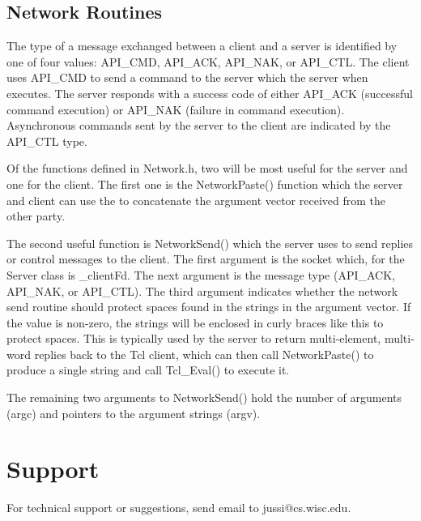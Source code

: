 \subsection{Network Routines\label{network}}

The type of a message exchanged between a client and a server is
identified by one of four values: API\_CMD, API\_ACK, API\_NAK, or
API\_CTL. The client uses API\_CMD to send a command to the server which
the server when executes. The server responds with a success code of
either API\_ACK (successful command execution) or API\_NAK (failure in
command execution). Asynchronous commands sent by the server to the
client are indicated by the API\_CTL type.

Of the functions defined in Network.h, two will be most useful for the
server and one for the client. The first one is the NetworkPaste()
function which the server and client can use the to concatenate the
argument vector received from the other party.

The second useful function is NetworkSend() which the server uses to
send replies or control messages to the client. The first argument is
the socket which, for the Server class is \_clientFd. The next
argument is the message type (API\_ACK, API\_NAK, or API\_CTL). The
third argument indicates whether the network send routine should
protect spaces found in the strings in the argument vector. If the
value is non-zero, the strings will be enclosed in curly braces {like
this} to protect spaces. This is typically used by the server to
return multi-element, multi-word replies back to the Tcl client, which
can then call NetworkPaste() to produce a single string and call
Tcl\_Eval() to execute it.

The remaining two arguments to NetworkSend() hold the number of
arguments (argc) and pointers to the argument strings (argv).

\section{Support}

For technical support or suggestions, send email to jussi@cs.wisc.edu.


